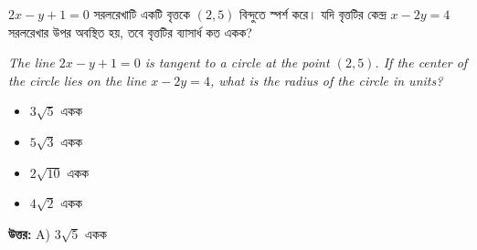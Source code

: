 \documentclass[12pt, a4paper]{article}
\begin{document}
\begin{tcolorbox}[questionbox={প্রশ্ন (Question) 3}]
    \noindent
    $2x - y + 1 = 0$ সরলরেখাটি একটি বৃত্তকে $(2, 5)$ বিন্দুতে স্পর্শ করে। যদি বৃত্তটির কেন্দ্র $x - 2y = 4$ সরলরেখার উপর অবস্থিত হয়, তবে বৃত্তটির ব্যাসার্ধ কত একক?
    
    \vspace{0.8em}
    \begin{english}
    \noindent\textit{\color{darkgray}
    The line $2x - y + 1 = 0$ is tangent to a circle at the point $(2, 5)$. If the center of the circle lies on the line $x - 2y = 4$, what is the radius of the circle in units?
    }
    \end{english}
\end{tcolorbox}

\vspace{1em}
\begin{itemize}[label={}, leftmargin=1cm, itemsep=0.5em]
    \item[\textbf{A)}] $3\sqrt{5}$ একক
    \item[\textbf{B)}] $5\sqrt{3}$ একক
    \item[\textbf{C)}] $2\sqrt{10}$ একক
    \item[\textbf{D)}] $4\sqrt{2}$ একক
\end{itemize}

\vspace{0.5em}
\begin{tcolorbox}[answerbox]
    \textbf{\color{success} উত্তর:} A) $3\sqrt{5}$ একক
\end{tcolorbox}
\vspace{1em}
\end{document}
